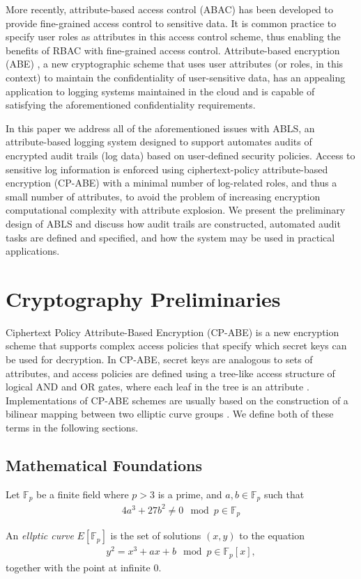 \documentclass{sig-alternate}
\newenvironment{definition}[1][Definition]{\begin{trivlist}
\item[\hskip \labelsep {\bfseries #1}]}{\end{trivlist}}
\begin{document}
More recently, attribute-based access control (ABAC) \cite{TODOTODO} has been developed to 
provide fine-grained access control to sensitive data. It is common practice to specify user roles as attributes
in this access control scheme, thus enabling the benefits of RBAC with fine-grained access control.
Attribute-based encryption (ABE) \cite{Goyal2006-ABAC}, a new cryptographic scheme that uses 
user attributes (or roles, in this context) to maintain the confidentiality of user-sensitive data, has an appealing application
to logging systems maintained in the cloud and is capable of satisfying the aforementioned confidentiality 
requirements. 

In this paper we address all of the aforementioned issues with ABLS, an attribute-based logging system designed
to support automates audits of encrypted audit trails (log data) based on user-defined security policies. Access to
sensitive log information is enforced using ciphertext-policy attribute-based encryption (CP-ABE) with a minimal number
of log-related roles, and thus a small number of attributes, to avoid the problem of increasing encryption computational
complexity with attribute explosion. We present the preliminary design of ABLS and discuss how audit trails are 
constructed, automated audit tasks are defined and specified, and how the system may be used in practical applications.

\section{Cryptography Preliminaries}
Ciphertext Policy Attribute-Based Encryption (CP-ABE) is a new encryption scheme that supports complex
access policies that specify which secret keys can be used for decryption. In CP-ABE, secret keys are analogous
to sets of attributes, and access policies are defined using a tree-like access structure of logical AND and OR
gates, where each leaf in the tree is an attribute \cite{Bethencourt2007-CPABE}. Implementations of 
CP-ABE schemes are usually based on the construction of a bilinear mapping between two elliptic curve 
groups \cite{Bethencourt2007-CPABE} \cite{Junod2010-ABE}. We define both of these terms in the following sections.

\subsection{Mathematical Foundations}
\begin{definition}
Let $\mathbb{F}_p$ be a finite field where $p > 3$ is a prime, and $a, b \in \mathbb{F}_p$ such that
\begin{align*}
4a^3 + 27b^2 \not= 0 \mod p \in \mathbb{F}_p
\end{align*}

An \emph{ellptic curve} $E[\mathbb{F}_p]$ is the set of solutions $(x, y)$ to the equation
\begin{align*}
y^2 = x^3 + ax + b \mod p \in \mathbb{F}_p[x],
\end{align*}
together with the point at infinite $0$.
\end{definition}
\end{document}
